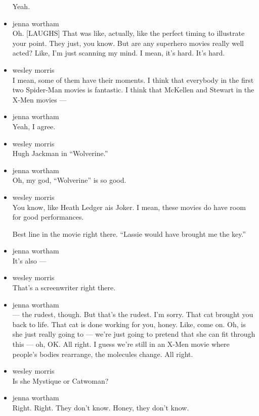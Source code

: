 \begin{itemize}
  Yeah.
\item
  jenna wortham\\
  Oh. {[}LAUGHS{]} That was like, actually, like the perfect timing to
  illustrate your point. They just, you know. But are any superhero
  movies really well acted? Like, I'm just scanning my mind. I mean,
  it's hard. It's hard.
\item
  wesley morris\\
  I mean, some of them have their moments. I think that everybody in the
  first two Spider-Man movies is fantastic. I think that McKellen and
  Stewart in the X-Men movies ---
\item
  jenna wortham\\
  Yeah, I agree.
\item
  wesley morris\\
  Hugh Jackman in ``Wolverine.''
\item
  jenna wortham\\
  Oh, my god, ``Wolverine'' is so good.
\item
  wesley morris\\
  You know, like Heath Ledger ais Joker. I mean, these movies do have
  room for good performances.

  Best line in the movie right there. ``Lassie would have brought me the
  key.''
\item
  jenna wortham\\
  It's also ---
\item
  wesley morris\\
  That's a screenwriter right there.
\item
  jenna wortham\\
  --- the rudest, though. But that's the rudest. I'm sorry. That cat
  brought you back to life. That cat is done working for you, honey.
  Like, come on. Oh, is she just really going to --- we're just going to
  pretend that she can fit through this --- oh, OK. All right. I guess
  we're still in an X-Men movie where people's bodies rearrange, the
  molecules change. All right.
\item
  wesley morris\\
  Is she Mystique or Catwoman?
\item
  jenna wortham\\
  Right. Right. They don't know. Honey, they don't know.


\end{itemize}
